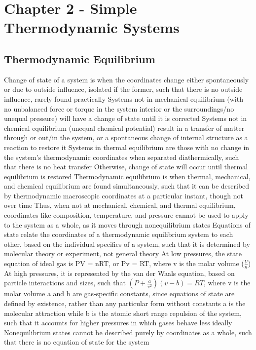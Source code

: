 \documentclass[11 pt, twoside]{article}
\newenvironment{outline*}
{
	\begin{outline}[enumerate]
	}
	{\end{outline}
}
\begin{document}
\section{Chapter 2 - Simple Thermodynamic Systems}
\subsection{Thermodynamic Equilibrium}
\begin{outline*}
\1 Change of state of a system is when the coordinates change either spontaneously or due to outside influence, isolated if the former, such that there is no outside influence, rarely found practically
\2 Systems not in mechanical equilibrium (with no unbalanced force or torque in the system interior or the surroundings/no unequal pressure) will have a change of state until it is corrected
\2 Systems not in chemical equilibrium (unequal chemical potential) result in a transfer of matter through or out/in the system, or a spontaneous change of internal structure as a reaction to restore it
\2 Systems in thermal equilibrium are those with no change in the system's thermodynamic coordinates when separated diathermically, such that there is no heat transfer
\3 Otherwise, change of state will occur until thermal equilibrium is restored
\1 Thermodynamic equilibrium is when thermal, mechanical, and chemical equilibrium are found simultaneously, such that it can be described by thermodynamic macroscopic coordinates at a particular instant, though not over time
\2 Thus, when not at mechanical, chemical, and thermal equilibrium, coordinates like composition, temperature, and pressure cannot be used to apply to the system as a whole, as it moves through nonequilibrium states
\1 Equations of state relate the coordinates of a thermodynamic equilibrium system to each other, based on the individual specifics of a system, such that it is determined by molecular theory or experiment, not general theory
\2 At low pressures, the state equation of ideal gas is PV = nRT, or Pv = RT, where v is the molar volume ($\frac{V}{n}$)
\2 At high pressures, it is represented by the van der Waals equation, based on particle interactions and sizes, such that $(P + \frac{a}{v^2})(v - b) = RT$, where v is the molar volume
\3 a and b are gas-specific constants, since equations of state are defined by existence, rather than any particular form without constants
\3 a is the molecular attraction while b is the atomic short range repulsion of the system, such that it accounts for higher pressures in which gases behave less ideally 
\2 Nonequilibrium states cannot be described purely by coordinates as a whole, such that there is no equation of state for the system
\end{outline*}
\end{document}
